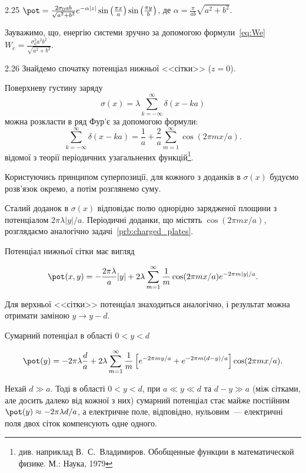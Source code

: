 \begin{Solution}{2.{25}}
	$\pot  = \frac{{2{\sigma _0}ab}}{{\sqrt {{a^2} + {b^2}} }}{e^{ - \alpha |z|}}\sin \left( {\frac{{\pi x}}{a}} \right)\sin \left( {\frac{{\pi y}}{b}} \right)$, де $\alpha  = \frac{\pi }{{ab}}\sqrt {{a^2} + {b^2}}$.

    Зауважимо, що, енергію системи зручно за допомогою формули~\eqref{eq:We}
	$W_e =  \frac{{\sigma _0^2{a^2}{b^2}}}{{\sqrt {{a^2} + {b^2}} }}$.
\end{Solution}
\begin{Solution}{2.{26}}
	Знайдемо спочатку потенціал нижньої <<сітки>> ($z = 0$).

Поверхневу густину заряду
\[
    \sigma(x) = \lambda\sum\limits_{k = -\infty}^{\infty} \delta(x - ka)
\]
можна розкласти в ряд Фур'є за допомогою формули:
	\[
		\sum\limits_{k = -\infty}^{\infty} \delta(x - ka) =  \frac{1}{a} + \frac{2}{a}\sum\limits_{m=1}^{\infty}\cos(2\pi mx/a).
	\]
відомої з теорії періодичних узагальнених функцій\footnote{див. наприклад В.~С.~Владимиров. Обобщенные функции в математической физике. М.: Наука, 1979}.

Користуючись принципом суперпозиції, для кожного з доданків в $\sigma(x)$  будуємо розв’язок окремо, а потім розглянемо суму.

Сталий доданок в $\sigma(x)$  відповідає полю однорідно зарядженої площини з потенціалом $2\pi\lambda|y|/a$. Періодичні доданки, що містять $\cos(2\pi mx/a)$, розглядаємо аналогічно задачі~\ref{prb:charged_plates}.

Потенціал нижньої сітки має вигляд


	\[
		\pot(x,y) = -\frac{2\pi\lambda}{a}|y| + 2\lambda\sum\limits_{m = 1}^{\infty} \frac1m \cos(2\pi mx/a)e^{-2\pi m|y|/a}.
	\]

	Для верхньої  <<сітки>> потенціал знаходиться аналогічно, і результат можна отримати заміною $y \to y - d$.

    Сумарний потенціал в області $0 < y <d$


	\[
		\pot(y) = -2\pi\lambda\frac{d}{a} + 2\lambda\sum\limits_{m = 1}^{\infty} \frac1m \left[ e^{-2\pi my/a} +  e^{-2\pi m (d - y)/a} \right] \cos(2\pi mx/a).
	\]

Нехай $d \gg a$. Тоді в області $0<y<d$, при $a \ll y \ll d$ та $d - y \gg a$ (між сітками, але досить
далеко від кожної з них) сумарний потенціал стає майже постійним $\pot(y) \approx  - 2\pi \lambda
d/a$, а електричне поле, відповідно, нульовим~--- електричні поля двох сіток компенсують одне одного.

\end{Solution}
